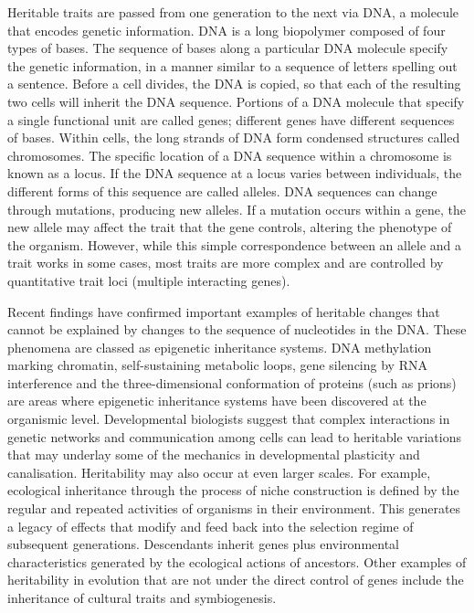 Heritable traits are passed from one generation to the next via DNA, a molecule that encodes genetic information. DNA is a long biopolymer composed of four types of bases. The sequence of bases along a particular DNA molecule specify the genetic information, in a manner similar to a sequence of letters spelling out a sentence. Before a cell divides, the DNA is copied, so that each of the resulting two cells will inherit the DNA sequence. Portions of a DNA molecule that specify a single functional unit are called genes; different genes have different sequences of bases. Within cells, the long strands of DNA form condensed structures called chromosomes. The specific location of a DNA sequence within a chromosome is known as a locus. If the DNA sequence at a locus varies between individuals, the different forms of this sequence are called alleles. DNA sequences can change through mutations, producing new alleles. If a mutation occurs within a gene, the new allele may affect the trait that the gene controls, altering the phenotype of the organism. However, while this simple correspondence between an allele and a trait works in some cases, most traits are more complex and are controlled by quantitative trait loci (multiple interacting genes).

Recent findings have confirmed important examples of heritable changes that cannot be explained by changes to the sequence of nucleotides in the DNA. These phenomena are classed as epigenetic inheritance systems. DNA methylation marking chromatin, self-sustaining metabolic loops, gene silencing by RNA interference and the three-dimensional conformation of proteins (such as prions) are areas where epigenetic inheritance systems have been discovered at the organismic level. Developmental biologists suggest that complex interactions in genetic networks and communication among cells can lead to heritable variations that may underlay some of the mechanics in developmental plasticity and canalisation. Heritability may also occur at even larger scales. For example, ecological inheritance through the process of niche construction is defined by the regular and repeated activities of organisms in their environment. This generates a legacy of effects that modify and feed back into the selection regime of subsequent generations. Descendants inherit genes plus environmental characteristics generated by the ecological actions of ancestors. Other examples of heritability in evolution that are not under the direct control of genes include the inheritance of cultural traits and symbiogenesis.

